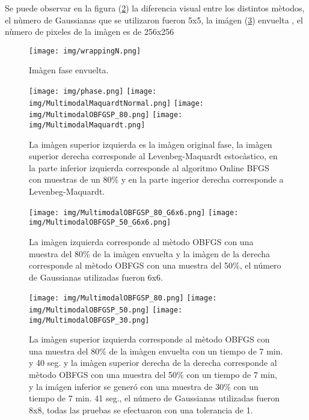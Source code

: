 Se puede observar en la figura (\ref{FaseImg}) la diferencia visual entre los distintos m\`etodos, el n\`umero de Gaussianas que se utilizaron fueron 5x5, la imágen (\ref{EnvueltaImg}) envuelta , el n\`umero de pixeles de la im\`agen es de 256x256 
\begin{figure}[H]\label{EnvueltaImg} 
	\centering
	\texttt{[image: img/wrappingN.png]}
		\caption{Im\`agen fase envuelta.}
\end{figure}

\begin{figure}[H]\label{FaseImg}
	\centering
	\texttt{[image: img/phase.png]}
	\texttt{[image: img/MultimodalMaquardtNormal.png]}
	\texttt{[image: img/MultimodalOBFGSP\_80.png]}
\texttt{[image: img/MultimodalMaquardt.png]}	
		\caption{La im\`agen superior izquierda es la im\`agen original fase, la im\`agen superior derecha corresponde al Levenbeg-Maquardt estoc\`astico, en la parte inferior izquierda corresponde al algoritmo Online BFGS con muestras de un 80\% y en la parte ingerior derecha corresponde a Levenbeg-Maquardt.}
\end{figure}
\begin{figure}[H]\label{EnvueltaImg} 
	\centering
	\texttt{[image: img/MultimodalOBFGSP\_80\_G6x6.png]}
	\texttt{[image: img/MultimodalOBFGSP\_50\_G6x6.png]}
		\caption{La im\`agen izquierda corresponde al m\`etodo OBFGS con una muestra del 80\% de la im\`agen envuelta y la im\`agen de la derecha corresponde al m\`etodo OBFGS con una muestra del 50\%, el número de Gaussianas utilizadas fueron 6x6.}
\end{figure}
\begin{figure}[H]\label{EnvueltaImgG8} 
	\centering
	\texttt{[image: img/MultimodalOBFGSP\_80.png]}
	\texttt{[image: img/MultimodalOBFGSP\_50.png]}
	\texttt{[image: img/MultimodalOBFGSP\_30.png]}
		\caption{La im\`agen superior izquierda corresponde al m\`etodo OBFGS con una muestra del 80\% de la im\`agen envuelta con un tiempo de 7 min. y 40 seg. y la im\`agen superior derecha de la derecha corresponde al m\`etodo OBFGS con una muestra del 50\% con un tiempo de 7 min, y la imágen inferior se generó con una muestra de 30\% con un tiempo de 7 min. 41 seg., el número de Gaussianas utilizadas fueron 8x8, todas las pruebas se efectuaron con una tolerancia de 1.}
\end{figure}
